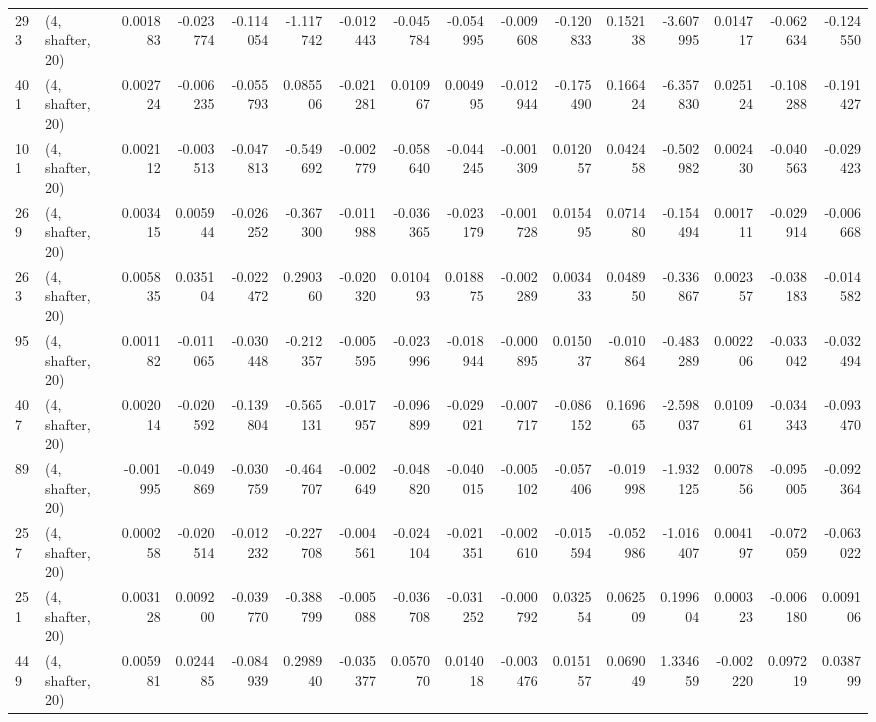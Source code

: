 \begin{tabular}{llrrrrrrrrrrrrrr}
293 &  (4, shafter, 20) &   0.001883 & -0.023774 & -0.114054 &   -1.117742 & -0.012443 &  -0.045784 & -0.054995 & -0.009608 & -0.120833 &  0.152138 &   -3.607995 &  0.014717 & -0.062634 & -0.124550 \\
401 &  (4, shafter, 20) &   0.002724 & -0.006235 & -0.055793 &    0.085506 & -0.021281 &   0.010967 &  0.004995 & -0.012944 & -0.175490 &  0.166424 &   -6.357830 &  0.025124 & -0.108288 & -0.191427 \\
101 &  (4, shafter, 20) &   0.002112 & -0.003513 & -0.047813 &   -0.549692 & -0.002779 &  -0.058640 & -0.044245 & -0.001309 &  0.012057 &  0.042458 &   -0.502982 &  0.002430 & -0.040563 & -0.029423 \\
269 &  (4, shafter, 20) &   0.003415 &  0.005944 & -0.026252 &   -0.367300 & -0.011988 &  -0.036365 & -0.023179 & -0.001728 &  0.015495 &  0.071480 &   -0.154494 &  0.001711 & -0.029914 & -0.006668 \\
263 &  (4, shafter, 20) &   0.005835 &  0.035104 & -0.022472 &    0.290360 & -0.020320 &   0.010493 &  0.018875 & -0.002289 &  0.003433 &  0.048950 &   -0.336867 &  0.002357 & -0.038183 & -0.014582 \\
95  &  (4, shafter, 20) &   0.001182 & -0.011065 & -0.030448 &   -0.212357 & -0.005595 &  -0.023996 & -0.018944 & -0.000895 &  0.015037 & -0.010864 &   -0.483289 &  0.002206 & -0.033042 & -0.032494 \\
407 &  (4, shafter, 20) &   0.002014 & -0.020592 & -0.139804 &   -0.565131 & -0.017957 &  -0.096899 & -0.029021 & -0.007717 & -0.086152 &  0.169665 &   -2.598037 &  0.010961 & -0.034343 & -0.093470 \\
89  &  (4, shafter, 20) &  -0.001995 & -0.049869 & -0.030759 &   -0.464707 & -0.002649 &  -0.048820 & -0.040015 & -0.005102 & -0.057406 & -0.019998 &   -1.932125 &  0.007856 & -0.095005 & -0.092364 \\
257 &  (4, shafter, 20) &   0.000258 & -0.020514 & -0.012232 &   -0.227708 & -0.004561 &  -0.024104 & -0.021351 & -0.002610 & -0.015594 & -0.052986 &   -1.016407 &  0.004197 & -0.072059 & -0.063022 \\
251 &  (4, shafter, 20) &   0.003128 &  0.009200 & -0.039770 &   -0.388799 & -0.005088 &  -0.036708 & -0.031252 & -0.000792 &  0.032554 &  0.062509 &    0.199604 &  0.000323 & -0.006180 &  0.009106 \\
449 &  (4, shafter, 20) &   0.005981 &  0.024485 & -0.084939 &    0.298940 & -0.035377 &   0.057070 &  0.014018 & -0.003476 &  0.015157 &  0.069049 &    1.334659 & -0.002220 &  0.097219 &  0.038799 \\

\end{tabular}
